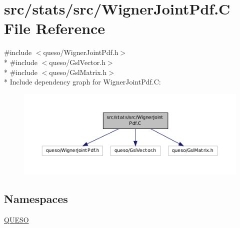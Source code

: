 \hypertarget{_wigner_joint_pdf_8_c}{\section{src/stats/src/\-Wigner\-Joint\-Pdf.C File Reference}
\label{_wigner_joint_pdf_8_c}
}
{\ttfamily \#include $<$queso/\-Wigner\-Joint\-Pdf.\-h$>$}\\*
{\ttfamily \#include $<$queso/\-Gsl\-Vector.\-h$>$}\\*
{\ttfamily \#include $<$queso/\-Gsl\-Matrix.\-h$>$}\\*
Include dependency graph for Wigner\-Joint\-Pdf.\-C\-:
\nopagebreak
\begin{figure}[H]
\begin{center}
\leavevmode
\includegraphics[width=350pt]{_wigner_joint_pdf_8_c__incl}
\end{center}
\end{figure}
\subsection*{Namespaces}
\begin{DoxyCompactItemize}
\item 
\hyperlink{namespace_q_u_e_s_o}{Q\-U\-E\-S\-O}
\end{DoxyCompactItemize}
